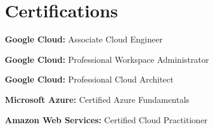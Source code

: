 \documentclass[letterpaper,11pt]{article}
\newcommand{\resumeSubHeadingListStart}{\begin{itemize}[leftmargin=0.0in, label={}]}
\newcommand{\resumeSubHeadingListEnd}{\end{itemize}}
\begin{document}
\section{Certifications}
  \vspace{2pt}
  \resumeSubHeadingListStart
    \small{\item{
        \textbf{Google Cloud: }{Associate Cloud Engineer} \\ \vspace{3pt}

        \textbf{Google Cloud: }{Professional Workspace Administrator} \\ \vspace{3pt}

        \textbf{Google Cloud: }{Professional Cloud Architect} \\ \vspace{3pt}
    
        \textbf{Microsoft Azure:} {Certified Azure Fundamentals} \\ \vspace{3pt}
        
        \textbf{Amazon Web Services:} {Certified Cloud Practitioner} \\ \vspace{3pt}


    }}
  \resumeSubHeadingListEnd
\end{document}

